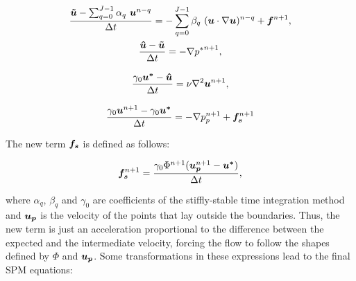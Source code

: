 \begin{subequations}
\begin{gather}
    \frac{\boldsymbol{\tilde{u}}-\sum_{q=0}^{J-1}\alpha_q~\boldsymbol{u}^{n-q}}{\Delta t} = -\sum_{q=0}^{J-1}\beta_q~(\boldsymbol{u}\cdot\nabla\boldsymbol{u})^{n-q} + \boldsymbol{f}^{n+1},\\
    \frac{\boldsymbol{\hat{u}}-\boldsymbol{\tilde{u}}}{\Delta t} = -\nabla {p^*}^{n+1},\\[3mm]
    \frac{\gamma_0\boldsymbol{u^*}-\boldsymbol{\hat{u}}}{\Delta t} = \nu\nabla^2\boldsymbol{u}^{n+1},\\[3mm]
    \frac{\gamma_0\boldsymbol{u}^{n+1}-\gamma_0\boldsymbol{u^*}}{\Delta t} = -\nabla p_p^{n+1} + \boldsymbol{f_s}^{n+1}
\end{gather}
\end{subequations}

The new term $\boldsymbol{f_s}$ is defined as follows:

\begin{equation}
    \boldsymbol{f_s}^{n+1} = \frac{\gamma_0\Phi^{n+1}(\boldsymbol{u_p}^{n+1}-\boldsymbol{u^*})}{\Delta t},
\end{equation}

where $\alpha_q$, $\beta_q$ and $\gamma_0$ are coefficients of the stiffly-stable time integration method and $\boldsymbol{u_p}$ is the velocity of the points that lay outside the boundaries. Thus, the new term is just an acceleration proportional to the difference between the expected and the intermediate velocity, forcing the flow to follow the shapes defined by $\Phi$ and $\boldsymbol{u_p}$. Some transformations in these expressions lead to the final SPM equations:

